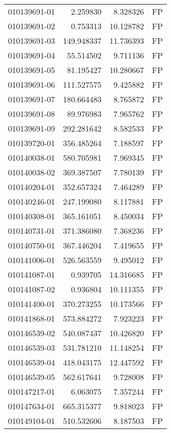 \begin{tabular}{lrrl}
010139691-01 &    2.259830 &     8.328326 &   FP \\
010139691-02 &    0.753313 &    10.128782 &   FP \\
010139691-03 &  149.948337 &    11.736393 &   FP \\
010139691-04 &   55.514502 &     9.711136 &   FP \\
010139691-05 &   81.195427 &    10.280667 &   FP \\
010139691-06 &  111.527575 &     9.425882 &   FP \\
010139691-07 &  180.664483 &     8.765872 &   FP \\
010139691-08 &   89.976983 &     7.965762 &   FP \\
010139691-09 &  292.281642 &     8.582533 &   FP \\
010139720-01 &  356.485264 &     7.188597 &   FP \\
010140038-01 &  580.705981 &     7.969345 &   FP \\
010140038-02 &  369.387507 &     7.780139 &   FP \\
010140204-01 &  352.657324 &     7.464289 &   FP \\
010140246-01 &  247.199080 &     8.117881 &   FP \\
010140308-01 &  365.161051 &     8.450034 &   FP \\
010140731-01 &  371.386080 &     7.368236 &   FP \\
010140750-01 &  367.446204 &     7.419655 &   FP \\
010141006-01 &  526.563559 &     9.495012 &   FP \\
010141087-01 &    0.939705 &    14.316685 &   FP \\
010141087-02 &    0.936804 &    10.111355 &   FP \\
010141400-01 &  370.273255 &    10.173566 &   FP \\
010141868-01 &  573.884272 &     7.923223 &   FP \\
010146539-02 &  540.087437 &    10.426820 &   FP \\
010146539-03 &  531.781210 &    11.148254 &   FP \\
010146539-04 &  418.043175 &    12.447592 &   FP \\
010146539-05 &  562.617641 &     9.728008 &   FP \\
010147217-01 &    6.063075 &     7.357244 &   FP \\
010147634-01 &  665.315377 &     9.818023 &   FP \\
010149104-01 &  510.532606 &     8.187503 &   FP \\

\end{tabular}
